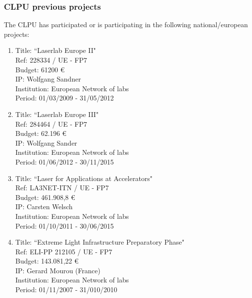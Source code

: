 
\subsubsection*{CLPU previous projects}

The CLPU has participated or is participating in the following national/european projects: 

\begin{enumerate}

\item Title: ``Laserlab Europe II"\\
Ref:    228334 / UE - FP7 \\
Budget:  61200 \euro \\
IP:  Wolfgang Sandner \\
Institution:  European Network of labs \\
Period: 01/03/2009 - 31/05/2012 \\

\item Title: ``Laserlab Europe III"\\
Ref:  284464  / UE - FP7 \\
Budget:  62.196 \euro \\
IP:   Wolfgang Sander\\
Institution:  European Network of labs \\
Period:  01/06/2012 - 30/11/2015 \\

\item Title: ``Laser for Applications at Accelerators"\\
Ref:   LA3NET-ITN     / UE - FP7 \\
Budget:  461.908,8 \euro \\
IP:  Carsten Welsch \\
Institution:  European Network of labs \\
Period:   01/10/2011 - 30/06/2015 \\

\item Title: ``Extreme Light Infrastructure Preparatory Phase"\\
Ref:   ELI-PP 212105  / UE - FP7 \\
Budget: 143.081,22 \euro \\
IP:  Gerard Mourou (France) \\
Institution:  European Network of labs \\
Period:  01/11/2007 - 31/010/2010 \\


\end{enumerate}

